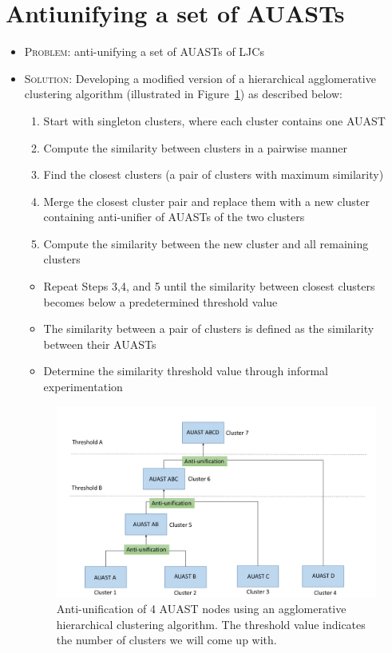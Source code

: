 \section{Antiunifying a set of AUASTs} \label{meth-clustering}
\begin{itemize} [leftmargin=.1in]
\item \textsc{Problem: } anti-unifying a set of AUASTs of LJCs
\item \textsc{Solution: }Developing a modified version of a hierarchical agglomerative clustering algorithm (illustrated in Figure~\ref{fig:overview2}) as described below:
\begin{enumerate} [leftmargin=.3in]
\item Start with singleton clusters, where each cluster contains one AUAST
\item Compute the similarity between clusters in a pairwise manner
\item Find the closest clusters (a pair of clusters with maximum  similarity)
\item Merge the closest cluster pair and replace them with a new cluster containing anti-unifier of AUASTs of the two clusters
\item Compute the similarity between the new cluster and all remaining clusters
\end{enumerate}
\begin{itemize} [leftmargin=.3in]
\item Repeat Steps 3,4, and 5 until the similarity between closest clusters becomes below a predetermined threshold value
\item The similarity between a pair of clusters is defined as the similarity between their AUASTs
\item Determine the similarity threshold value through informal experimentation
\end{itemize}
\begin{figure} [H]
  \centering\includegraphics [width = \textwidth]{Drawing4/overview2.pdf}
  \caption{Anti-unification of 4 AUAST nodes using an agglomerative hierarchical clustering algorithm. The threshold value indicates the number of clusters we will come up with.}
  \label{fig:overview2}
\end{figure}
\end{itemize}

